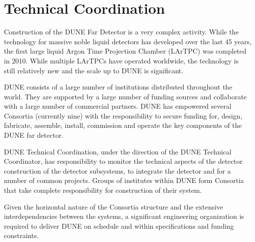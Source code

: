 \chapter{Technical Coordination}
\label{ch:fdsp-coord}

Construction of the DUNE Far Detector is a very complex
activity. While the technology for massive noble liquid detectors has
developed over the last 45 years, the first large liquid Argon Time
Projection Chamber (LArTPC) was completed in 2010. While multiple
LArTPCs have operated worldwide, the technology is still relatively
new and the scale up to DUNE is significant.

DUNE consists of a large number of institutions distributed throughout
the world. They are supported by a large number of funding sources and
collaborate with a large number of commercial partners. DUNE has
empowered several Consortia (currently nine) with the responsibility
to secure funding for, design, fabricate, assemble, install,
commission and operate the key components of the DUNE far detector.

DUNE Technical Coordination, under the direction of the DUNE Technical
Coordinator, has responsibility to monitor the technical aspects of
the detector construction of the detector subsystems, to integrate the
detector and for a number of common projects. Groups of institutes
within DUNE form Consortia that take complete responsibility for
construction of their system.

Given the horizontal nature of the Consortia structure and the
extensive interdependencies between the systems, a significant
engineering organization is required to deliver DUNE on schedule and
within specifications and funding constraints.






